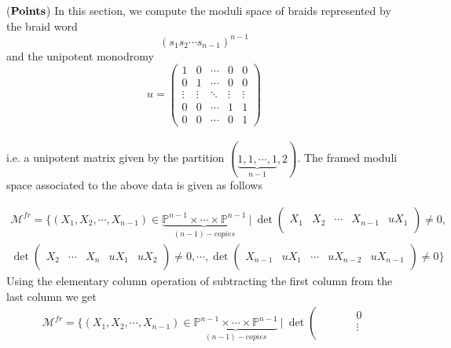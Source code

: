 \begin{example}
($\bf{Points}$) In this section, we compute the moduli space of braids represented by the braid word \[(s_1s_2\cdots s_{n-1})^{n-1}\] and the unipotent monodromy 
\[u= 
\begin{pmatrix}
	1&0&\cdots&0&0\\
	0&1&\cdots&0&0\\
	\vdots&\vdots&\ddots&\vdots&\vdots\\
	0&0&\cdots&1&1\\
	0&0&\cdots&0&1
\end{pmatrix}
\] \\
i.e. a unipotent matrix given by the partition $(\underbrace{1,1,\cdots,1}_{n-1},2)$.
The framed moduli space associated to the above data is given as follows

	\begin{align*}
		\mathcal{M}^{fr}=\{(X_1,X_2,\cdots,X_{n-1}) \in 						\underbrace{\mathbb{P}^{n-1}\times \cdots \times \mathbb{P}^{n-1}}_{(n-1)-copies}~|~		
		\operatorname{det}
		\left( \begin{array}{c|c|c|c|c}
			& & & &\\
			X_1&X_2&\cdots&X_{n-1}&uX_1\\
			& & & &
		\end{array}\right)
		\neq 0, \\
		\operatorname{det}
		\left( \begin{array}{c|c|c|c|c}
			& & & &\\
			X_2&\cdots & X_{n} & uX_1 & uX_2\\
			& & & &
		\end{array}\right)
		\neq 0,\cdots , \operatorname{det}
		\left( \begin{array}{c|c|c|c|c}
			& & & &\\
			X_{n-1}&uX_1&\cdots&uX_{n-2}&uX_{n-1}\\
			& & & &
		\end{array}\right)
		\neq 0\}
	\end{align*}
Using the elementary column operation of subtracting the first column from the last column we get
	\begin{align*}
		\mathcal{M}^{fr}=\{(X_1,X_2,\cdots,X_{n-1}) \in 						\underbrace{\mathbb{P}^{n-1}\times \cdots \times					\mathbb{P}^{n-1}}_{(n-1)-copies}~|~		
		\operatorname{det}
		\left( \begin{array}{c|c|c|c|c}
			& & & &0\\
			& & & &\vdots\\

\end{array}
\end{align*}
\end{example}
